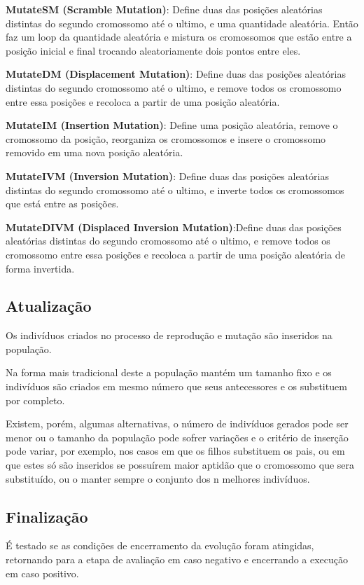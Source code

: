 \textbf{MutateSM (Scramble Mutation)}: Define duas das posições aleatórias distintas do segundo cromossomo até o ultimo, e uma quantidade aleatória. Então faz um loop da quantidade aleatória e mistura os cromossomos que estão entre a posição inicial e final trocando aleatoriamente dois pontos entre eles.

\textbf{MutateDM (Displacement Mutation)}: Define duas das posições aleatórias distintas do segundo cromossomo até o ultimo, e remove todos os cromossomo entre essa posições e recoloca a partir de uma posição aleatória.

\textbf{MutateIM (Insertion Mutation)}: Define uma posição aleatória, remove o cromossomo da posição, reorganiza os cromossomos e insere o cromossomo removido em uma nova posição aleatória.

\textbf{MutateIVM (Inversion Mutation)}: Define duas das posições aleatórias distintas do segundo cromossomo até o ultimo, e inverte todos os cromossomos que está entre as posições.

\textbf{MutateDIVM (Displaced Inversion Mutation)}:Define duas das posições aleatórias distintas do segundo cromossomo até o ultimo, e remove todos os cromossomo entre essa posições e recoloca a partir de uma posição aleatória de forma invertida.

\subsection{Atualização}
Os indivíduos criados no processo de reprodução e mutação são inseridos na população.

Na forma mais tradicional deste a população mantém um tamanho fixo e os indivíduos são criados em mesmo número que seus antecessores e os substituem por completo. 

Existem, porém, algumas alternativas, o número de indivíduos gerados pode ser menor ou o tamanho da população pode sofrer variações e o critério de inserção pode variar, por exemplo, nos casos em que os filhos substituem os pais, ou em que estes só são inseridos se possuírem maior aptidão que o cromossomo que sera substituído, ou o manter sempre o conjunto dos n melhores indivíduos. 

\subsection{Finalização}
É testado se as condições de encerramento da evolução foram atingidas, retornando para a etapa de avaliação em caso negativo e encerrando a execução em caso positivo.

